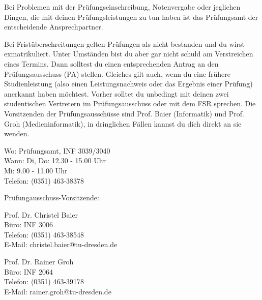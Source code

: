 Bei Problemen mit der Prüfungseinschreibung, Notenvergabe oder jeglichen Dingen, die mit deinen Prüfungsleistungen zu tun haben ist das Prüfungsamt der entscheidende Ansprechpartner.

Bei Fristüberschreitungen gelten Prüfungen als nicht bestanden und du wirst exmatrikuliert.
Unter Umständen bist du aber gar nicht schuld am Verstreichen eines Termins.
Dann solltest du einen entsprechenden Antrag an den Prüfungsausschuss (PA) stellen.
Gleiches gilt auch, wenn du eine frühere Studienleistung (also einen Leistungsnachweis oder das Ergebnis einer Prüfung) anerkannt haben möchtest.
Vorher solltet du unbedingt mit deinen zwei studentischen Vertretern im Prüfungsausschuss oder mit dem FSR sprechen.
Die Vorsitzenden der Prüfungsausschüsse sind Prof. Baier (Informatik) und Prof. Groh (Medieninformatik), in dringlichen Fällen kannst du dich direkt an sie wenden.

Wo: Prüfungsamt, INF 3039/3040 \\
Wann: Di, Do: 12.30 - 15.00 Uhr \\
Mi: 9.00 - 11.00 Uhr \\
Telefon: (0351) 463-38378

Prüfungausschuss-Vorsitzende:

\begin{multicols}{2}
Prof. Dr. Christel Baier \\
Büro: INF 3006 \\
Telefon: (0351) 463-38548 \\
E-Mail: christel.baier@tu-dresden.de

Prof. Dr. Rainer Groh \\
Büro: INF 2064 \\
Telefon: (0351) 463-39178 \\
E-Mail: rainer.groh@tu-dresden.de
\end{multicols}
